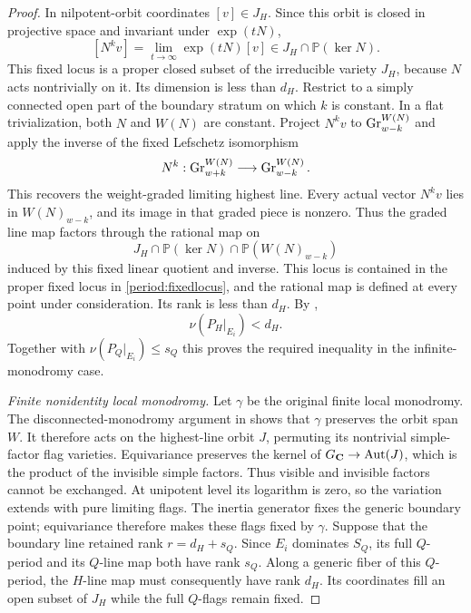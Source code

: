 \begin{proof}
In nilpotent-orbit coordinates $[v]\in J_H$.  Since this orbit
is closed in projective space and invariant under $\exp(tN)$,
\begin{equation}
\label{period:fixedlocus}
       [N^kv]=\lim_{t\to\infty}\exp(tN)[v]
                \in J_H\cap\mathbb P(\ker N).
\end{equation}
This fixed locus is a proper closed subset of the irreducible
variety $J_H$, because $N$ acts nontrivially on it.  Its dimension
is less than $d_H$.  Restrict to a simply connected open part of the boundary stratum
on which $k$ is constant.  In a flat trivialization, both $N$ and
$W(N)$ are constant.  Project $N^kv$ to
$\operatorname{Gr}^{W(N)}_{w-k}$ and apply the inverse of the fixed Lefschetz
isomorphism
\[
 N^k:\operatorname{Gr}^{W(N)}_{w+k}\longrightarrow\operatorname{Gr}^{W(N)}_{w-k}.
\]
This recovers the weight-graded limiting highest line.  Every actual
vector $N^kv$ lies in $W(N)_{w-k}$, and its image in that graded
piece is nonzero.  Thus the graded line map factors through the
rational map on
\[
 J_H\cap\mathbb P(\ker N)\cap\mathbb P(W(N)_{w-k})
\]
induced by this fixed linear quotient and inverse.  This locus is
contained in the proper fixed locus in \eqref{period:fixedlocus},
and the rational map is defined at every point under consideration.
Its rank is less than $d_H$.
By ,
\[
                       \nu(P_H|_{E_i})<d_H.
\]
Together with $\nu(P_Q|_{E_i})\leq s_Q$ this proves the
required inequality in the infinite-monodromy case.

\smallskip\noindent
\emph{Finite nonidentity local monodromy.}
Let $\gamma$ be the original finite local monodromy.  The
disconnected-monodromy argument in 
shows that $\gamma$ preserves the orbit span $W$.  It therefore acts
on the highest-line orbit $J$, permuting its nontrivial simple-factor
flag varieties. Equivariance preserves the kernel of
$G_{\mathbf C}\to\operatorname{Aut}(J)$, which is the product of the
invisible simple factors. Thus visible and invisible factors cannot
be exchanged. At unipotent level its logarithm is zero, so the variation extends
with pure limiting flags.  The inertia generator fixes the generic
boundary point; equivariance therefore makes these flags fixed by
$\gamma$.  Suppose that the
boundary line retained rank $r=d_H+s_Q$.  Since $E_i$ dominates $S_Q$,
its full $Q$-period and its $Q$-line map both have rank $s_Q$.
Along a generic fiber of this $Q$-period, the $H$-line map
must consequently have rank $d_H$.  Its coordinates fill an
open subset of $J_H$ while the full $Q$-flags remain fixed.


\end{proof}
